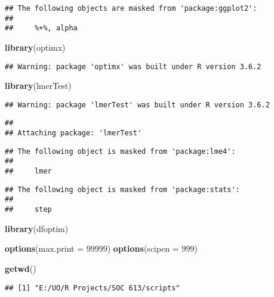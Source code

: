 \documentclass[]{article}
\newenvironment{Shaded}{\begin{snugshade}}{\end{snugshade}}
\newcommand{\DataTypeTok}[1]{\textcolor[rgb]{0.13,0.29,0.53}{#1}}
\newcommand{\DecValTok}[1]{\textcolor[rgb]{0.00,0.00,0.81}{#1}}
\newcommand{\KeywordTok}[1]{\textcolor[rgb]{0.13,0.29,0.53}{\textbf{#1}}}
\newcommand{\NormalTok}[1]{#1}
\begin{document}
\begin{verbatim}
## The following objects are masked from 'package:ggplot2':
## 
##     %+%, alpha
\end{verbatim}

\begin{Shaded}
\begin{Highlighting}[]
\KeywordTok{library}\NormalTok{(optimx)}
\end{Highlighting}
\end{Shaded}

\begin{verbatim}
## Warning: package 'optimx' was built under R version 3.6.2
\end{verbatim}

\begin{Shaded}
\begin{Highlighting}[]
\KeywordTok{library}\NormalTok{(lmerTest)}
\end{Highlighting}
\end{Shaded}

\begin{verbatim}
## Warning: package 'lmerTest' was built under R version 3.6.2
\end{verbatim}

\begin{verbatim}
## 
## Attaching package: 'lmerTest'
\end{verbatim}

\begin{verbatim}
## The following object is masked from 'package:lme4':
## 
##     lmer
\end{verbatim}

\begin{verbatim}
## The following object is masked from 'package:stats':
## 
##     step
\end{verbatim}

\begin{Shaded}
\begin{Highlighting}[]
\KeywordTok{library}\NormalTok{(dfoptim)}

\KeywordTok{options}\NormalTok{(}\DataTypeTok{max.print =} \DecValTok{99999}\NormalTok{)}
\KeywordTok{options}\NormalTok{(}\DataTypeTok{scipen =} \DecValTok{999}\NormalTok{)}

\KeywordTok{getwd}\NormalTok{()}
\end{Highlighting}
\end{Shaded}

\begin{verbatim}
## [1] "E:/UO/R Projects/SOC 613/scripts"
\end{verbatim}
\end{document}
